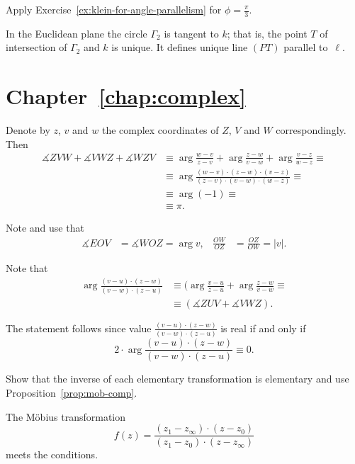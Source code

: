 Apply Exercise~\ref{ex:klein-for-angle-parallelism} for $\phi=\tfrac\pi3$.

In the Euclidean plane the circle $\Gamma_2$ is tangent to $k$; 
that is,  the point $T$ of intersection of $\Gamma_2$ and $k$ is unique.
It defines unique line $(PT)$  parallel to~$\ell$.



\section*{Chapter~\ref{chap:complex}}
\setcounter{eqtn}{0}

Denote by $z$, $v$ and $w$ the complex coordinates of $Z$, $V$ and $W$ correspondingly.
Then 
\begin{align*}
\measuredangle ZVW+\measuredangle VWZ+\measuredangle WZV
&\equiv
\arg \tfrac{w-v}{z-v}+\arg \tfrac{z-w}{v-w}+\arg \tfrac{v-z}{w-z}\equiv
\\
&\equiv
\arg \tfrac{(w-v)\cdot(z-w)\cdot(v-z)}{(z-v)\cdot(v-w)\cdot(w-z)}\equiv
\\
&\equiv\arg (-1)\equiv
\\
&\equiv\pi.
\end{align*}

Note and use that 
\begin{align*}
\measuredangle EOV&=\measuredangle WOZ=\arg v,
&
\frac{OW}{OZ}&=\frac{OZ}{OW}=|v|.
\end{align*}

Note that 
\begin{align*}
\arg\frac{(v-u)\cdot(z-w)}{(v-w)\cdot(z-u)}
&\equiv
(\arg\frac{v-u}{z-u}
+
\arg\frac{z-w}{v-w}\equiv
\\
&\equiv (\measuredangle ZUV+\measuredangle VWZ).
\end{align*}

The statement follows since value $\tfrac{(v-u)\cdot(z-w)}{(v-w)\cdot(z-u)}$ is real if and only if 
\[2\cdot\arg\frac{(v-u)\cdot(z-w)}{(v-w)\cdot(z-u)}\equiv0.\]


Show that the inverse of each elementary transformation is elementary
and use Proposition~\ref{prop:mob-comp}.

The M\"obius transformation
\[f(z)=\frac{(z_1-z_\infty)\cdot(z-z_0)}{(z_1-z_0)\cdot(z-z_\infty)}\]
meets the conditions.

